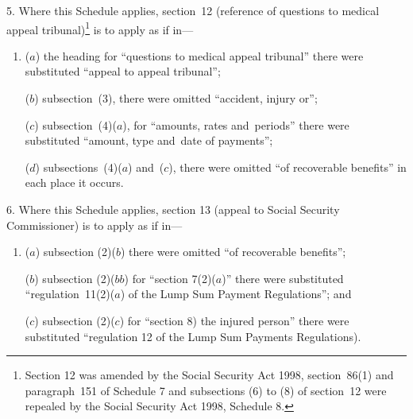 \documentclass[12pt,a4paper]{article}
\begin{document}
5.  Where this Schedule applies, section~12 (reference of questions to medical appeal tribunal)\footnote{Section 12 was amended by the Social Security Act 1998, section~86(1) and paragraph~151 of Schedule 7 and subsections (6) to (8) of section~12 were repealed by the Social Security Act 1998, Schedule 8.} is to apply as if in—
\begin{enumerate}\item[]
($a$) the heading for “questions to medical appeal tribunal” there were substituted “appeal to appeal tribunal”;

($b$) subsection~(3), there were omitted “accident, injury or”;

($c$) subsection~(4)($a$), for “amounts, rates and~periods” there were substituted “amount, type and~date of payments”;

($d$) subsections~(4)($a$)  and~($c$), there were omitted “of recoverable benefits” in each place it occurs.
\end{enumerate}

\medskip

%

6.  Where this Schedule applies, section 13 (appeal to Social Security Commissioner) is to apply as if in—
\begin{enumerate}\item[]
($a$) subsection (2)($b$)  there were omitted “of recoverable benefits”;

($b$) subsection (2)($bb$)  for “section 7(2)($a$)” there were substituted “regulation~11(2)($a$)  of the Lump Sum Payment Regulations”; and

($c$) subsection (2)($c$)  for “section 8) the injured person” there were substituted “regulation 12 of the Lump Sum Payments Regulations).
\end{enumerate}
\end{document}
